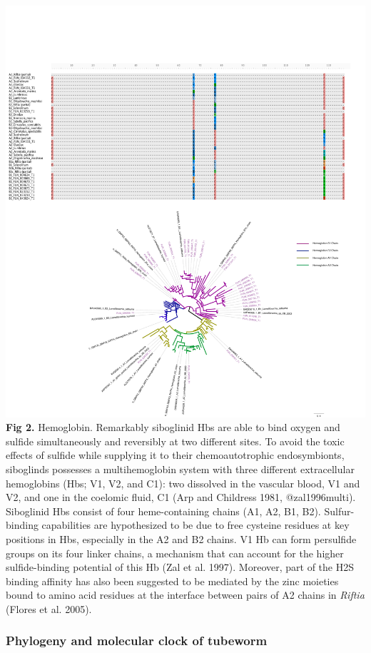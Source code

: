 \documentclass[]{article}
\begin{document}
\includegraphics{../figures/hemoglobin.pdf} \textbf{Fig 2.} Hemoglobin.
Remarkably siboglinid Hbs are able to bind oxygen and sulfide
simultaneously and reversibly at two different sites. To avoid the toxic
effects of sulfide while supplying it to their chemoautotrophic
endosymbionts, siboglinds possesses a multihemoglobin system with three
different extracellular hemoglobins (Hbs; V1, V2, and C1): two dissolved
in the vascular blood, V1 and V2, and one in the coelomic fluid, C1 (Arp
and Childress 1981, @zal1996multi). Siboglinid Hbs consist of four
heme-containing chains (A1, A2, B1, B2). Sulfur-binding capabilities are
hypothesized to be due to free cysteine residues at key positions in
Hbs, especially in the A2 and B2 chains. V1 Hb can form persulfide
groups on its four linker chains, a mechanism that can account for the
higher sulfide-binding potential of this Hb (Zal et al. 1997). Moreover,
part of the H2S binding affinity has also been suggested to be mediated
by the zinc moieties bound to amino acid residues at the interface
between pairs of A2 chains in \emph{Riftia} (Flores et al. 2005).

\hypertarget{phylogeny-and-molecular-clock-of-tubeworm}{%
\subsubsection{Phylogeny and molecular clock of
tubeworm}\label{phylogeny-and-molecular-clock-of-tubeworm}}
\end{document}
